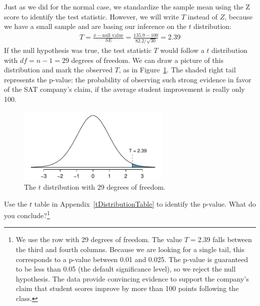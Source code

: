 Just as we did for the normal case, we standardize the sample mean using the Z score to identify the test statistic. However, we will write $T$ instead of $Z$, because we have a small sample and are basing our inference on the $t$ distribution:
\begin{eqnarray*}
T = \frac{\bar{x} - \text{null value}}{SE} = \frac{135.9 - 100}{82.2/\sqrt{30}} = 2.39
\end{eqnarray*}
If the null hypothesis was true, the test statistic $T$ would follow a $t$ distribution with $df = n-1 = 29$ degrees of freedom. We can draw a picture of this distribution and mark the observed $T$, as in Figure~\ref{pValueShownForSATHTOfOver100PtGain}. The shaded right tail represents the p-value: the probability of observing such strong evidence in favor of the SAT company's claim, if the average student improvement is really only 100.

\begin{figure}
\centering
\includegraphics[width=0.65\textwidth]{05/figures/pValueShownForSATHTOfOver100PtGain/pValueShownForSATHTOfOver100PtGain}
\caption{The $t$ distribution with 29 degrees of freedom.}
\label{pValueShownForSATHTOfOver100PtGain}
\end{figure}

\textB{\pagebreak}

\begin{exercise}
Use the $t$ table in Appendix~\vref{tDistributionTable} to identify the p-value. What do you conclude?\footnote{We use the row with 29 degrees of freedom. The value $T=2.39$ falls between the third and fourth columns. Because we are looking for a single tail, this corresponds to a p-value between 0.01 and 0.025. The p-value is guaranteed to be less than 0.05 (the default significance level), so we reject the null hypothesis. The data provide convincing evidence to support the company's claim that student scores improve by more than 100 points following the class.}
\end{exercise}

